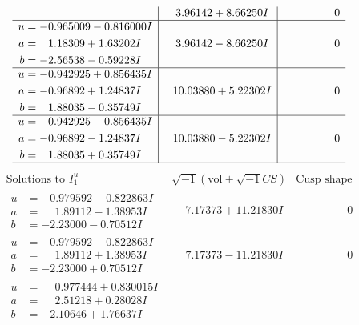 \documentclass[1p]{elsarticle_modified}
\theoremstyle{definition}
\newcommand{\I}{\sqrt{-1}}
\begin{document}
$$\begin{array}{c|c|c}
 & \phantom{-}3.96142 + 8.66250 I & \phantom{-0.000000 } 0 \\ \hline\begin{aligned}
u &= -0.965009 - 0.816000 I \\
a &= \phantom{-}1.18309 + 1.63202 I \\
b &= -2.56538 - 0.59228 I\end{aligned}
 & \phantom{-}3.96142 - 8.66250 I & \phantom{-0.000000 } 0 \\ \hline\begin{aligned}
u &= -0.942925 + 0.856435 I \\
a &= -0.96892 + 1.24837 I \\
b &= \phantom{-}1.88035 - 0.35749 I\end{aligned}
 & \phantom{-}10.03880 + 5.22302 I & \phantom{-0.000000 } 0 \\ \hline\begin{aligned}
u &= -0.942925 - 0.856435 I \\
a &= -0.96892 - 1.24837 I \\
b &= \phantom{-}1.88035 + 0.35749 I\end{aligned}
 & \phantom{-}10.03880 - 5.22302 I & \phantom{-0.000000 } 0\\
 \hline 
 \end{array}$$\newpage$$\begin{array}{c|c|c}  
\text{Solutions to }I^u_{1}& \I (\text{vol} + \sqrt{-1}CS) & \text{Cusp shape}\\
 \hline 
\begin{aligned}
u &= -0.979592 + 0.822863 I \\
a &= \phantom{-}1.89112 - 1.38953 I \\
b &= -2.23000 - 0.70512 I\end{aligned}
 & \phantom{-}7.17373 + 11.21830 I & \phantom{-0.000000 } 0 \\ \hline\begin{aligned}
u &= -0.979592 - 0.822863 I \\
a &= \phantom{-}1.89112 + 1.38953 I \\
b &= -2.23000 + 0.70512 I\end{aligned}
 & \phantom{-}7.17373 - 11.21830 I & \phantom{-0.000000 } 0 \\ \hline\begin{aligned}
u &= \phantom{-}0.977444 + 0.830015 I \\
a &= \phantom{-}2.51218 + 0.28028 I \\
b &= -2.10646 + 1.76637 I\end{aligned}

\end{array}$$
\end{document}
